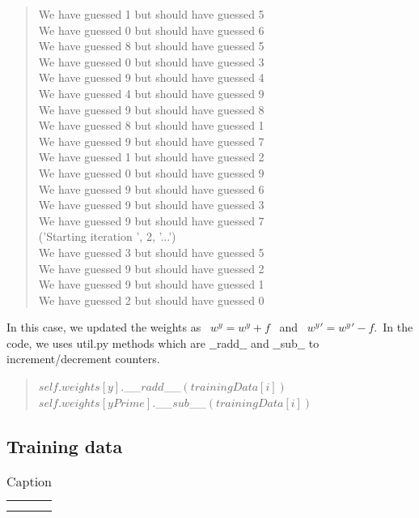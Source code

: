 \documentclass{article}
\begin{document}
\begin{quote}
        We have guessed 1 but should have guessed 5\\
        We have guessed 0 but should have guessed 6\\
        We have guessed 8 but should have guessed 5\\
        We have guessed 0 but should have guessed 3\\
        We have guessed 9 but should have guessed 4\\
        We have guessed 4 but should have guessed 9\\
        We have guessed 9 but should have guessed 8\\
        We have guessed 8 but should have guessed 1\\
        We have guessed 9 but should have guessed 7\\
        We have guessed 1 but should have guessed 2\\
        We have guessed 0 but should have guessed 9\\
        We have guessed 9 but should have guessed 6\\
        We have guessed 9 but should have guessed 3\\
        We have guessed 9 but should have guessed 7\\
        ('Starting iteration ', 2, '...')\\
        We have guessed 3 but should have guessed 5\\
        We have guessed 9 but should have guessed 2\\
        We have guessed 9 but should have guessed 1\\
        We have guessed 2 but should have guessed 0\\
        \end{quote}
            

        
        In this case, we updated the weights as \ $w^y = w^y + f$ \ and \ $w^y' = w^y' - f$.\ In the code, we uses util.py methods which are $\_\_$radd$\_\_$ and $\_\_$sub$\_\_$ to increment/decrement counters.
        \begin{quote}
            $self.weights[y].$\_\_$radd$\_\_$(trainingData[i])$\\
            $self.weights[yPrime].$\_\_$sub$\_\_$(trainingData[i])$
        \end{quote}
            
    \subsection{Training data}
        \begin{table}[]
            \centering
            \begin{tabular}{c|c}
                 &  \\
                 & 
            \end{tabular}
            \caption{Caption}
            \label{tab:my_label}
        \end{table}
\end{document}
